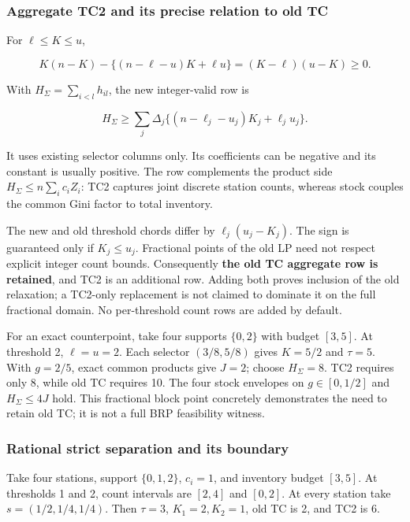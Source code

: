 \documentclass[
  american,
  11pt,
]{article}
\begin{document}
\subsubsection{Aggregate TC2 and its precise relation to old
TC}\label{aggregate-tc2-and-its-precise-relation-to-old-tc}

For \(\ell\le K\le u\),

\[
K(n-K)-\{(n-\ell-u)K+\ell u\}=(K-\ell)(u-K)\ge0.
\]

With \(H_\Sigma=\sum_{i<l}h_{il}\), the new integer-valid row is

\[
H_\Sigma\ge\sum_j\Delta_j\{(n-\ell_j-u_j)K_j+\ell_ju_j\}.
\]

It uses existing selector columns only. Its coefficients can be negative
and its constant is usually positive. The row complements the product
side \(H_\Sigma\le n\sum_i c_iZ_i\): TC2 captures joint discrete station
counts, whereas stock couples the common Gini factor to total inventory.

The new and old threshold chords differ by \(\ell_j(u_j-K_j)\). The sign
is guaranteed only if \(K_j\le u_j\). Fractional points of the old LP
need not respect explicit integer count bounds. Consequently \textbf{the
old TC aggregate row is retained}, and TC2 is an additional row. Adding
both proves inclusion of the old relaxation; a TC2-only replacement is
not claimed to dominate it on the full fractional domain. No
per-threshold count rows are added by default.

For an exact counterpoint, take four supports \(\{0,2\}\) with budget
\([3,5]\). At threshold 2, \(\ell=u=2\). Each selector \((3/8,5/8)\)
gives \(K=5/2\) and \(\tau=5\). With \(g=2/5\), exact common products
give \(J=2\); choose \(H_\Sigma=8\). TC2 requires only 8, while old TC
requires 10. The four stock envelopes on \(g\in[0,1/2]\) and
\(H_\Sigma\le4J\) hold. This fractional block point concretely
demonstrates the need to retain old TC; it is not a full BRP feasibility
witness.

\subsubsection{Rational strict separation and its
boundary}\label{rational-strict-separation-and-its-boundary}

Take four stations, support \(\{0,1,2\}\), \(c_i=1\), and inventory
budget \([3,5]\). At thresholds 1 and 2, count intervals are \([2,4]\)
and \([0,2]\). At every station take \(s=(1/2,1/4,1/4)\). Then
\(\tau=3\), \(K_1=2,K_2=1\), old TC is 2, and TC2 is 6.
\end{document}
